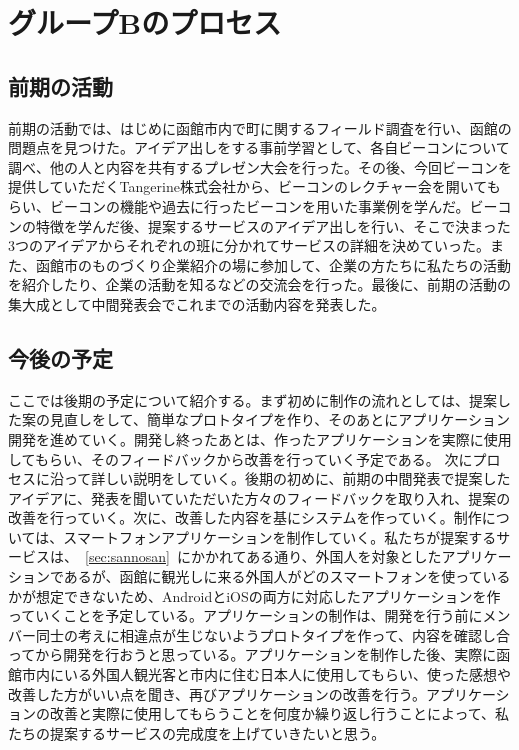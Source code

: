 \documentclass[11pt,papersize]{jsbook}
\begin{document}
\chapter{グループBのプロセス}

\section{前期の活動}
  前期の活動では、はじめに函館市内で町に関するフィールド調査を行い、函館の問題点を見つけた。アイデア出しをする事前学習として、各自ビーコンについて調べ、他の人と内容を共有するプレゼン大会を行った。その後、今回ビーコンを提供していただくTangerine株式会社から、ビーコンのレクチャー会を開いてもらい、ビーコンの機能や過去に行ったビーコンを用いた事業例を学んだ。ビーコンの特徴を学んだ後、提案するサービスのアイデア出しを行い、そこで決まった3つのアイデアからそれぞれの班に分かれてサービスの詳細を決めていった。また、函館市のものづくり企業紹介の場に参加して、企業の方たちに私たちの活動を紹介したり、企業の活動を知るなどの交流会を行った。最後に、前期の活動の集大成として中間発表会でこれまでの活動内容を発表した。

\section{今後の予定}
 ここでは後期の予定について紹介する。まず初めに制作の流れとしては、提案した案の見直しをして、簡単なプロトタイプを作り、そのあとにアプリケーション開発を進めていく。開発し終ったあとは、作ったアプリケーションを実際に使用してもらい、そのフィードバックから改善を行っていく予定である。
次にプロセスに沿って詳しい説明をしていく。後期の初めに、前期の中間発表で提案したアイデアに、発表を聞いていただいた方々のフィードバックを取り入れ、提案の改善を行っていく。次に、改善した内容を基にシステムを作っていく。制作については、スマートフォンアプリケーションを制作していく。私たちが提案するサービスは、~\ref{sec:sannosan}~にかかれてある通り、外国人を対象としたアプリケーションであるが、函館に観光しに来る外国人がどのスマートフォンを使っているかが想定できないため、AndroidとiOSの両方に対応したアプリケーションを作っていくことを予定している。アプリケーションの制作は、開発を行う前にメンバー同士の考えに相違点が生じないようプロトタイプを作って、内容を確認し合ってから開発を行おうと思っている。アプリケーションを制作した後、実際に函館市内にいる外国人観光客と市内に住む日本人に使用してもらい、使った感想や改善した方がいい点を聞き、再びアプリケーションの改善を行う。アプリケーションの改善と実際に使用してもらうことを何度か繰り返し行うことによって、私たちの提案するサービスの完成度を上げていきたいと思う。
\end{document}
